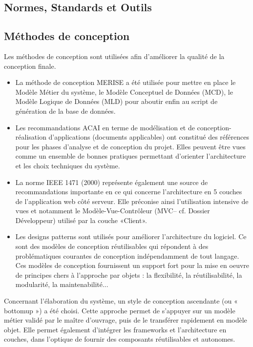 \documentclass[a4paper,12pt]{report}
\begin{document}
\begin{onehalfspace}
\chapter{Normes, Standards et Outils}

\section{Méthodes de conception}
  Les méthodes de conception sont utilisées afin d'améliorer la qualité de la conception finale.

\begin{itemize}
\item La méthode de conception MERISE a été utilisée pour mettre en place le Modèle Métier du système,  le  Modèle Conceptuel de Données (MCD), le  Modèle Logique de Données (MLD)  pour aboutir enfin au script de génération de la base de données.

\item Les recommandations ACAI en terme de modélisation et de conception-réalisation d'applications (documents applicables) ont constitué des références pour les phases d’analyse et de conception du projet. Elles peuvent être vues comme un ensemble de bonnes pratiques permettant d’orienter l’architecture et les choix techniques du système.


\item La  norme IEEE 1471 (2000) représente également une source de recommandations importante en ce qui concerne l’architecture en 5 couches de l’application web côté serveur. Elle préconise ainsi l’utilisation intensive de vues et notamment le Modèle-Vue-Contrôleur (MVC– cf. Dossier Développeur) utilisé par la couche «Client».

\item Les designs patterns sont utilisés pour améliorer l’architecture du logiciel. Ce sont des modèles de conception réutilisables qui répondent à des problématiques courantes de conception indépendamment de tout langage. Ces modèles de conception fournissent un support fort pour la mise en oeuvre de principes chers à l'approche par  objets : la flexibilité, la réutilisabilité, la modularité, la maintenabilité...\\
\end{itemize}

  Concernant l’élaboration du système, un style de conception ascendante (ou « bottomup ») a été choisi. Cette approche permet de s’appuyer sur un modèle métier validé par le maître d’ouvrage, puis de le transférer rapidement en modèle objet. Elle permet également d’intégrer les frameworks et l’architecture en couches, dans l’optique de fournir des composants réutilisables et autonomes.



\end{onehalfspace}
\end{document}
